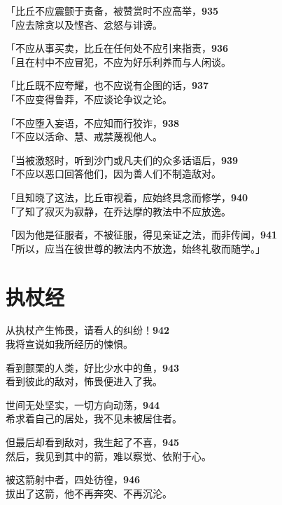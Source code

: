 「比丘不应震颤于责备，被赞赏时不应高举，\hfill{\grayfootnotesize \textbf{935}} \\
「应去除贪以及悭吝、忿怒与诽谤。

「不应从事买卖，比丘在任何处不应引来指责，\hfill{\grayfootnotesize \textbf{936}} \\
「且在村中不应冒犯，不应为好乐利养而与人闲谈。


「比丘既不应夸耀，也不应说有企图的话，\hfill{\grayfootnotesize \textbf{937}} \\
「不应变得鲁莽，不应谈论争议之论。


「不应堕入妄语，不应知而行狡诈，\hfill{\grayfootnotesize \textbf{938}} \\
「不应以活命、慧、戒禁蔑视他人。

「当被激怒时，听到沙门或凡夫们的众多话语后，\hfill{\grayfootnotesize \textbf{939}} \\
「不应以恶口回答他们，因为善人们不制造敌对。


「且知晓了这法，比丘审视着，应始终具念而修学，\hfill{\grayfootnotesize \textbf{940}} \\
「了知了寂灭为寂静，在乔达摩的教法中不应放逸。


「因为他是征服者，不被征服，得见亲证之法，而非传闻，\hfill{\grayfootnotesize \textbf{941}} \\
「所以，应当在彼世尊的教法内不放逸，始终礼敬而随学。」


\section{执杖经}


从执杖产生怖畏，请看人的纠纷！\hfill{\grayfootnotesize \textbf{942}} \\
我将宣说如我所经历的悚惧。


看到颤栗的人类，好比少水中的鱼，\hfill{\grayfootnotesize \textbf{943}} \\
看到彼此的敌对，怖畏便进入了我。


世间无处坚实，一切方向动荡，\hfill{\grayfootnotesize \textbf{944}} \\
希求着自己的居处，我不见未被居住者。


但最后却看到敌对，我生起了不喜，\hfill{\grayfootnotesize \textbf{945}} \\
然后，我见到其中的箭，难以察觉、依附于心。


被这箭射中者，四处彷徨，\hfill{\grayfootnotesize \textbf{946}} \\
拔出了这箭，他不再奔突、不再沉沦。


